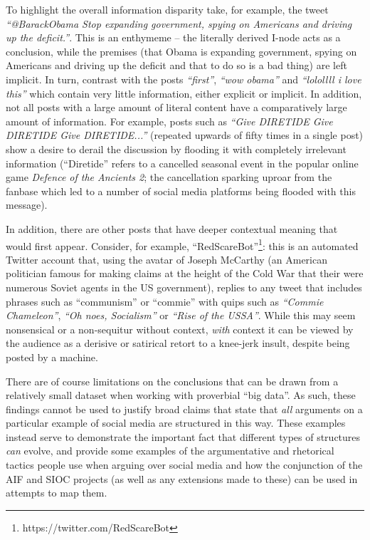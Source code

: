 To highlight the overall information disparity take, for example, the tweet \textit{``@BarackObama Stop expanding government, spying on Americans and driving up the deficit.''}. This is an enthymeme -- the literally derived I-node acts as a conclusion, while the premises (that Obama is expanding government, spying on Americans and driving up the deficit  and that to do so is a bad thing) are left implicit. In turn, contrast with the posts \textit{``first''}, \textit{``wow obama''} and \textit{``lolollll i love this''} which contain very little information, either explicit or implicit. In addition, not all posts with a large amount of literal content have a comparatively large amount of information. For example, posts such as \textit{``Give DIRETIDE Give DIRETIDE Give DIRETIDE...''} (repeated upwards of fifty times in a single post) show a desire to derail the discussion by flooding it with completely irrelevant information (``Diretide'' refers to a cancelled seasonal event in the popular online game \textit{Defence of the Ancients 2}; the cancellation sparking uproar from the fanbase which led to a number of social media platforms being flooded with this message).

In addition, there are other posts that have deeper contextual meaning that would first appear. Consider, for example, ``RedScareBot''\footnote{https://twitter.com/RedScareBot}: this is an automated Twitter account that, using the avatar of Joseph McCarthy (an American politician famous for making claims at the height of the Cold War that their were numerous Soviet agents in the US government), replies to any tweet that includes phrases such as ``communism'' or ``commie'' with quips such as \textit{``Commie Chameleon''}, \textit{``Oh noes, Socialism''} or \textit{``Rise of the USSA''}. While this may seem nonsensical or a non-sequitur without context, \textit{with} context it can be viewed by the audience as a derisive or satirical retort to a knee-jerk insult, despite being posted by a machine.

There are of course limitations on the conclusions that can be drawn from a relatively small dataset when working with proverbial ``big data''. As such, these findings cannot be used to justify broad claims that state that \textit{all} arguments on a particular example of social media are structured in this way. These examples instead serve to demonstrate the important fact that different types of structures \textit{can} evolve, and provide some examples of the argumentative and rhetorical tactics people use when arguing over social media and how the conjunction of the AIF and SIOC projects (as well as any extensions made to these) can be used in attempts to map them.

